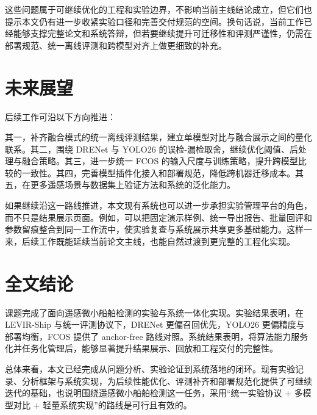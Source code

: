 这些问题属于可继续优化的工程和实验边界，不影响当前主线结论成立，但它们也提示本文仍有进一步收紧实验口径和完善交付规范的空间。换句话说，当前工作已经能够支撑完整论文和系统答辩，但若要继续提升可迁移性和评测严谨性，仍需在部署规范、统一离线评测和跨模型对齐上做更细致的补充。

\section{未来展望}

后续工作可沿以下方向推进：

其一，补齐融合模式的统一离线评测结果，建立单模型对比与融合展示之间的量化联系。其二，围绕 DRENet 与 YOLO26 的误检-漏检取舍，继续优化阈值、后处理与融合策略。其三，进一步统一 FCOS 的输入尺度与训练策略，提升跨模型比较的一致性。其四，完善模型插件化接入和部署规范，降低跨机器迁移成本。其五，在更多遥感场景与数据集上验证方法和系统的泛化能力。

如果继续沿这一路线推进，本文现有系统也可以进一步承担实验管理平台的角色，而不只是结果展示页面。例如，可以把固定演示样例、统一导出报告、批量回评和参数留痕整合到同一工作流中，使实验复查与系统展示共享更多基础能力。这样一来，后续工作既能延续当前论文主线，也能自然过渡到更完整的工程化实现。

\section{全文结论}

课题完成了面向遥感微小船舶检测的实验与系统一体化实现。实验结果表明，在 LEVIR-Ship 与统一评测协议下，DRENet 更偏召回优先，YOLO26 更偏精度与部署均衡，FCOS 提供了 anchor-free 路线对照。系统结果表明，将算法能力服务化并任务化管理后，能够显著提升结果展示、回放和工程交付的完整性。

总体来看，本文已经完成从问题分析、实验论证到系统落地的闭环。现有实验记录、分析框架与系统实现，为后续性能优化、评测补齐和部署规范化提供了可继续迭代的基础，也说明围绕遥感微小船舶检测这一任务，采用“统一实验协议 + 多模型对比 + 轻量系统实现”的路线是可行且有效的。
